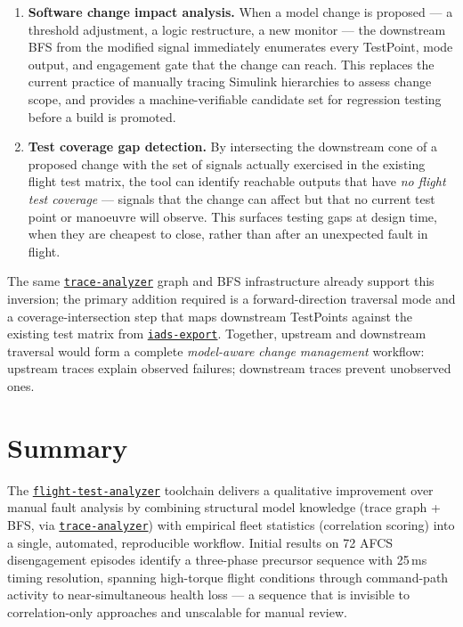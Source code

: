\documentclass[11pt, letterpaper]{article}
\newcommand{\repoFTA}{\href{https://github.com/francis-barchesky/flight-test-analyzer}{\texttt{flight-test-analyzer}}}
\newcommand{\repoIADS}{\href{https://github.com/merlinlabs/iads-export}{\texttt{iads-export}}}
\newcommand{\repoTrace}{\href{https://github.com/francis-barchesky/trace-analyzer}{\texttt{trace-analyzer}}}
\begin{document}
\begin{enumerate}[itemsep=3pt]
  \item \textbf{Software change impact analysis.}
    When a model change is proposed --- a threshold adjustment, a logic
    restructure, a new monitor --- the downstream BFS from the modified signal
    immediately enumerates every TestPoint, mode output, and engagement gate
    that the change can reach. This replaces the current practice of manually
    tracing Simulink hierarchies to assess change scope, and provides a
    machine-verifiable candidate set for regression testing before a build is
    promoted.
  \item \textbf{Test coverage gap detection.}
    By intersecting the downstream cone of a proposed change with the set of
    signals actually exercised in the existing flight test matrix, the tool can
    identify reachable outputs that have \emph{no flight test coverage} ---
    signals that the change can affect but that no current test point or
    manoeuvre will observe. This surfaces testing gaps at design time, when
    they are cheapest to close, rather than after an unexpected fault in flight.
\end{enumerate}

The same \repoTrace{} graph and BFS infrastructure already support this
inversion; the primary addition required is a forward-direction traversal mode
and a coverage-intersection step that maps downstream TestPoints against the
existing test matrix from \repoIADS{}. Together, upstream and downstream
traversal would form a complete \emph{model-aware change management} workflow:
upstream traces explain observed failures; downstream traces prevent unobserved
ones.

\section{Summary}

The \repoFTA{} toolchain delivers a qualitative improvement over manual fault
analysis by combining structural model knowledge (trace graph + BFS, via
\repoTrace{}) with empirical fleet statistics (correlation scoring) into a
single, automated, reproducible workflow. Initial results on 72 AFCS
disengagement episodes identify a three-phase precursor sequence with 25\,ms
timing resolution, spanning high-torque flight conditions through command-path
activity to near-simultaneous health loss --- a sequence that is invisible to
correlation-only approaches and unscalable for manual review.
\end{document}
